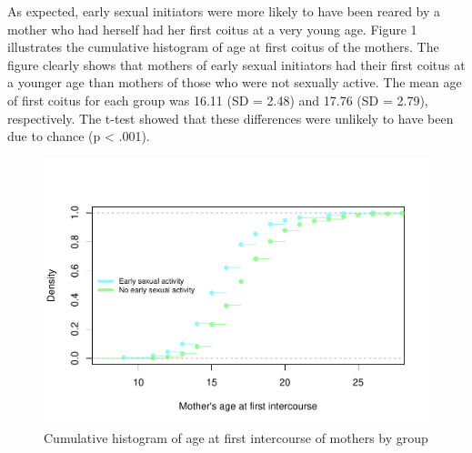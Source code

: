 \documentclass[
]{article}
\begin{document}
As expected, early sexual initiators were more likely to have been
reared by a mother who had herself had her first coitus at a very young
age. Figure 1 illustrates the cumulative histogram of age at first
coitus of the mothers. The figure clearly shows that mothers of early
sexual initiators had their first coitus at a younger age than mothers
of those who were not sexually active. The mean age of first coitus for
each group was 16.11 (SD = 2.48) and 17.76 (SD = 2.79), respectively.
The t-test showed that these differences were unlikely to have been due
to chance (p \textless{} .001).

\begin{figure}

{\centering \includegraphics[width=0.8\linewidth,height=0.7\textheight]{early_sexual_activity_report_files/figure-latex/unnamed-chunk-2-1} 

}

\caption{Cumulative histogram of age at first intercourse of mothers by group}\label{fig:unnamed-chunk-2}
\end{figure}
\end{document}
